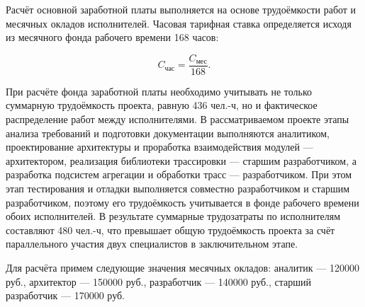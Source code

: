 Расчёт основной заработной платы выполняется на основе трудоёмкости
работ и месячных окладов исполнителей. Часовая тарифная ставка
определяется исходя из месячного фонда рабочего времени 168 часов:

\begin{equation}
C_{\text{час}} = \frac{C_{\text{мес}}}{168}.
\end{equation}

При расчёте фонда заработной платы необходимо учитывать не только
суммарную трудоёмкость проекта, равную 436 чел.-ч, но и фактическое
распределение работ между исполнителями. В рассматриваемом проекте
этапы анализа требований и подготовки документации выполняются
аналитиком, проектирование архитектуры и проработка взаимодействия
модулей --- архитектором, реализация библиотеки трассировки ---
старшим разработчиком, а разработка подсистем агрегации и обработки
трасс --- разработчиком. При этом этап тестирования и отладки
выполняется совместно разработчиком и старшим разработчиком, поэтому
его трудоёмкость учитывается в фонде рабочего времени обоих
исполнителей. В результате суммарные трудозатраты по исполнителям
составляют 480 чел.-ч, что превышает общую трудоёмкость проекта за
счёт параллельного участия двух специалистов в заключительном этапе.

Для расчёта примем следующие значения месячных окладов:
аналитик --- 120000 руб., архитектор --- 150000 руб., разработчик ---
140000 руб., старший разработчик --- 170000 руб.

\begin{table}[h]
\centering
\caption{Расчёт основной заработной платы исполнителей}
\label{tab:salary_calc}
\end{table}

